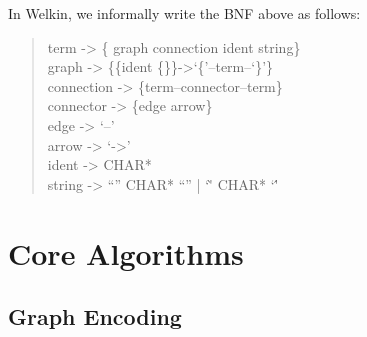 In Welkin, we informally write the BNF above as follows:
\begin{quote}{\ttfamily \raggedright \noindent
	term -> \{ graph connection ident string\}\\
	graph -> \{\{ident \{\}\}->`\{'--term--`\}'\}\\
	connection -> \{term--connector--term\}\\
	connector -> \{edge arrow\}\\
	edge -> `--'\\
	arrow -> `->'\\
	ident -> CHAR*\\
	string -> ``'' CHAR* ``'' | `\`' CHAR* `\''
}\end{quote}

\section{Core Algorithms}

\subsection{Graph Encoding}



\label{ch:spec}
